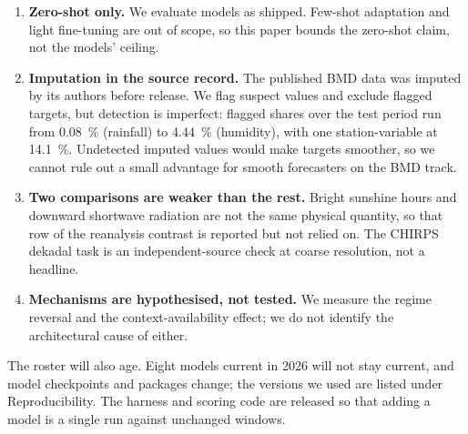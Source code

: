 \begin{enumerate}
    (72) and the skill intervals (432) are per-comparison. Their counts describe a pattern; no single interval in
    them is a corrected significance result. The spell contrasts also rest on few independent events, 11 or 12
    active and 18 to 21 break, so they cannot be read as station-day sample sizes.
  \item \textbf{Zero-shot only.} We evaluate models as shipped. Few-shot adaptation and light fine-tuning are out of
    scope, so this paper bounds the zero-shot claim, not the models' ceiling.
  \item \textbf{Imputation in the source record.} The published BMD data was imputed by its authors before release.
    We flag suspect values and exclude flagged targets, but detection is imperfect: flagged shares over the test
    period run from \SI{0.08}{\percent} (rainfall) to \SI{4.44}{\percent} (humidity), with one station-variable
    at \SI{14.1}{\percent}. Undetected imputed values would make targets smoother, so we cannot rule out a small
    advantage for smooth forecasters on the BMD track.
  \item \textbf{Two comparisons are weaker than the rest.} Bright sunshine hours and downward shortwave radiation are
    not the same physical quantity, so that row of the reanalysis contrast is reported but not relied on. The
    CHIRPS dekadal task is an independent-source check at coarse resolution, not a headline.
  \item \textbf{Mechanisms are hypothesised, not tested.} We measure the regime reversal and the
    context-availability effect; we do not identify the architectural cause of either.
\end{enumerate}

The roster will also age. Eight models current in 2026 will not stay current, and model checkpoints and
packages change; the versions we used are listed under Reproducibility. The harness and scoring code are released
so that adding a model is a single run against unchanged windows.
